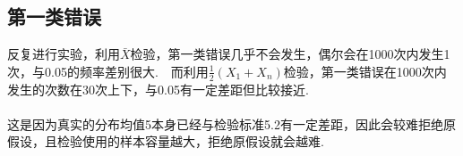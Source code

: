 \documentclass{article}
\begin{document}
\begin{CJK}{UTF8}{gbsn}
\subsection{第一类错误}
反复进行实验，利用$\bar{X}$检验，第一类错误几乎不会发生，偶尔会在1000次内发生1次，与0.05的频率差别很大.\ \ 而利用$\frac{1}{2}(X_{1}+X_{n})$检验，第一类错误在1000次内发生的次数在30次上下，与0.05有一定差距但比较接近.
\\\\
这是因为真实的分布均值5本身已经与检验标准5.2有一定差距，因此会较难拒绝原假设，且检验使用的样本容量越大，拒绝原假设就会越难.
\end{CJK}
\end{document}
